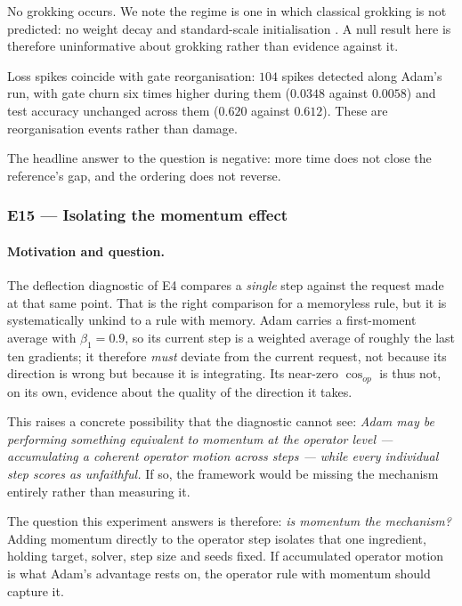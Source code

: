 \documentclass{article} %
\theoremstyle{plain}
\theoremstyle{definition}
\theoremstyle{remark}
\begin{document}
No grokking occurs. We note the regime is one in which classical grokking is not predicted: no
weight decay and standard-scale initialisation \citep{liu2023omnigrok}. A null result here is
therefore uninformative about grokking rather than evidence against it.

Loss spikes coincide with gate reorganisation: $104$ spikes detected along Adam's run, with gate
churn six times higher during them ($0.0348$ against $0.0058$) and test accuracy unchanged across
them ($0.620$ against $0.612$). These are reorganisation events rather than damage.

The headline answer to the question is negative: more time does not close the reference's gap, and
the ordering does not reverse.

\subsubsection{E15 --- Isolating the momentum effect}
\label{sec:e15}

\paragraph{Motivation and question.}
The deflection diagnostic of E4 compares a \emph{single} step against the request made at that same
point. That is the right comparison for a memoryless rule, but it is systematically unkind to a rule
with memory. Adam carries a first-moment average with $\beta_1 = 0.9$, so its current step is a
weighted average of roughly the last ten gradients; it therefore \emph{must} deviate from the
current request, not because its direction is wrong but because it is integrating. Its near-zero
$\cos_{op}$ is thus not, on its own, evidence about the quality of the direction it takes.

This raises a concrete possibility that the diagnostic cannot see: \emph{Adam may be performing
something equivalent to momentum at the operator level --- accumulating a coherent operator motion
across steps --- while every individual step scores as unfaithful.} If so, the framework would be
missing the mechanism entirely rather than measuring it.

The question this experiment answers is therefore: \emph{is momentum the mechanism?} Adding momentum
directly to the operator step isolates that one ingredient, holding target, solver, step size and
seeds fixed. If accumulated operator motion is what Adam's advantage rests on, the operator rule
with momentum should capture it.
\end{document}
